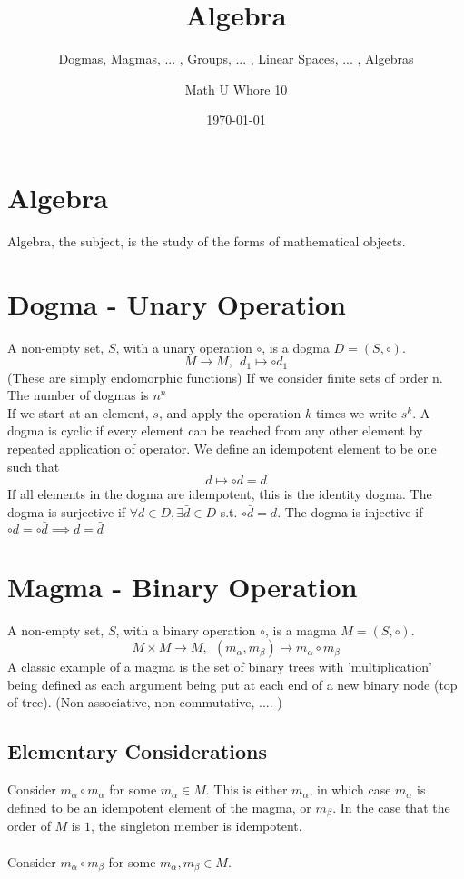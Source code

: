 \documentclass[a4paper]{scrartcl}
\title{Algebra}
\subtitle{Dogmas, Magmas, ... , Groups, ... , Linear Spaces, ... , Algebras}
\author{Math U Whore 10}
\date{\today}
\begin{document}
\maketitle

\section{Algebra}
Algebra, the subject, is the study of the forms of mathematical objects.

\section{Dogma - Unary Operation}
A non-empty set, $S$, with a unary operation $\circ$, is a dogma $D = (S,\circ)$.
$$M \rightarrow M,\ \  d_{1} \mapsto \circ d_{1}$$
(These are simply endomorphic functions)
If we consider finite sets of order n. The number of dogmas is $n^n$\\
If we start at an element, $s$, and apply the operation $k$ times we write $s^k$. A dogma is cyclic if every element can be reached from any other element by repeated application of operator.
We define an idempotent element to be one such that 
$$d \mapsto \circ d = d$$
If all elements in the dogma are idempotent, this is the identity dogma.
The dogma is surjective if $\forall d \in D, \exists \bar{d}\in D$ s.t. $\circ\bar{d} = d$. 
The dogma is injective if $\circ d = \circ\bar{d} \implies d=\bar{d}$ 


\section{Magma - Binary Operation}
A non-empty set, $S$, with a binary operation $\circ$, is a magma $M = (S,\circ)$. 
$$M\times M \rightarrow M, \ \ (m_{\alpha}, m_{\beta}) \mapsto m_{\alpha}\circ m_{\beta}$$
A classic example of a magma is the set of binary trees with 'multiplication' being defined as each argument being put at each end of a new binary node (top of tree). (Non-associative, non-commutative, .... )

\subsection{Elementary Considerations}
Consider $m_{\alpha}\circ m_{\alpha}$ for some $m_{\alpha}\in M$. This is either $m_{\alpha}$, in which case $m_{\alpha}$ is defined to be an idempotent element of the magma, or $m_{\beta}$. In the case that the order of $M$ is $1$, the singleton member is idempotent.\\ \\
Consider $m_{\alpha}\circ m_{\beta}$ for some $m_{\alpha}, m_{\beta}\in M$.
\end{document}
